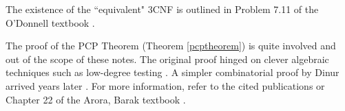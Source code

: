 \begin{remark}
  The existence of the ``equivalent" 3CNF is outlined in Problem 7.11 of the O'Donnell textbook \cite{o2014analysis}.
 \end{remark}

\begin{remark}
The proof of the PCP Theorem (Theorem \ref{pcptheorem}) is quite involved and out of the scope of these notes. The original proof hinged on clever algebraic techniques such as low-degree testing \cite{arora1998probabilistic}. A simpler combinatorial proof by Dinur arrived years later  \cite{dinur2007pcp}. For more information, refer to the cited publications or Chapter 22 of the Arora, Barak textbook \cite{arora2009computational}.
\end{remark}





